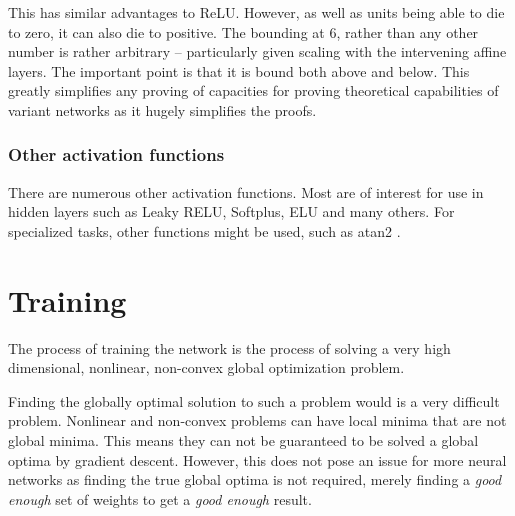 \documentclass[12pt,parskip]{komatufte}
\begin{document}
This has similar advantages to ReLU.
However, as well as units being able to die to zero, it can also die to positive.
The bounding at 6, rather than any other number is rather arbitrary -- particularly given scaling with the intervening affine layers.
The important point is that it is bound both above and below.
This greatly simplifies any proving of capacities for proving theoretical capabilities of variant networks as it hugely simplifies the proofs.



\subsubsection{Other activation functions}

There are numerous other activation functions.
Most are of interest for use in hidden layers such as Leaky RELU, Softplus, ELU and many others.
For specialized tasks, other functions might be used, such as atan2 .


\section{Training}
The process of training the network is the process of solving a very high dimensional, nonlinear, non-convex global optimization problem.


Finding the globally optimal solution to such a problem would is a very difficult problem.
Nonlinear and non-convex problems can have local minima that are not global minima.
This means they can not be guaranteed to be solved  a global optima by gradient descent.
However, this does not pose an issue for more neural networks as finding the true global optima is not required, merely finding a \emph{good enough} set of weights to get a \emph{good enough} result.
\end{document}
